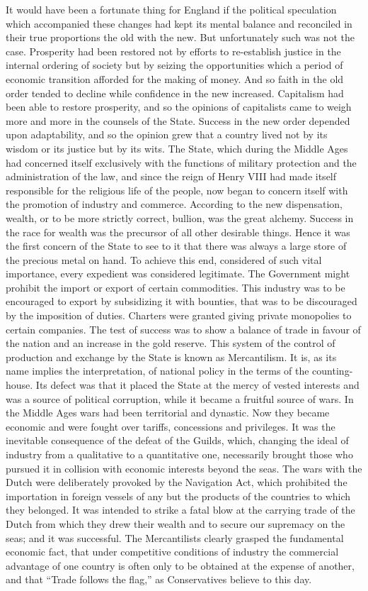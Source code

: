\documentclass{book}
\begin{document}
It would have been a fortunate thing for England if the political speculation which accompanied these changes had kept its mental balance and reconciled in their true proportions the old with the new. But unfortunately such was not the case. Prosperity had been restored not by efforts to re-establish justice in the internal ordering of society but by seizing the opportunities which a period of economic transition afforded for the making of money. And so faith in the old order tended to decline while confidence in the new increased. Capitalism had been able to restore prosperity, and so the opinions of capitalists came to weigh more and more in the counsels of the State. Success in the new order depended upon adaptability, and so the opinion grew that a country lived not by its wisdom or its justice but by its wits. The State, which during the Middle Ages had concerned itself exclusively with the functions of military protection and the administration of the law, and since the reign of Henry VIII had made itself responsible for the religious life of the people, now began to concern itself with the promotion of industry and commerce. According to the new dispensation, wealth, or to be more strictly correct, bullion, was the great alchemy. Success in the race for wealth was the precursor of all other desirable things. Hence it was the first concern of the State to see to it that there was always a large store of the precious metal on hand. To achieve this end, considered of such vital importance, every expedient was considered legitimate. The Government might prohibit the import or export of certain commodities. This industry was to be encouraged to export by subsidizing it with bounties, that was to be discouraged by the imposition of duties. Charters were granted giving private monopolies to certain companies. The test of success was to show a balance of trade in favour of the nation and an increase in the gold reserve. This system of the control of production and exchange by the State is known as Mercantilism. It is, as its name implies the interpretation, of national policy in the terms of the counting-house. Its defect was that it placed the State at the mercy of vested interests and was a source of political corruption, while it became a fruitful source of wars. In the Middle Ages wars had been territorial and dynastic. Now they became economic and were fought over tariffs, concessions and privileges. It was the inevitable consequence of the defeat of the Guilds, which, changing the ideal of industry from a qualitative to a quantitative one, necessarily brought those who pursued it in collision with economic interests beyond the seas. The wars with the Dutch were deliberately provoked by the Navigation Act, which prohibited the importation in foreign vessels of any but the products of the countries to which they belonged. It was intended to strike a fatal blow at the carrying trade of the Dutch from which they drew their wealth and to secure our supremacy on the seas; and it was successful. The Mercantilists clearly grasped the fundamental economic fact, that under competitive conditions of industry the commercial advantage of one country is often only to be obtained at the expense of another, and that “Trade follows the flag,” as Conservatives believe to this day. 
\end{document}
